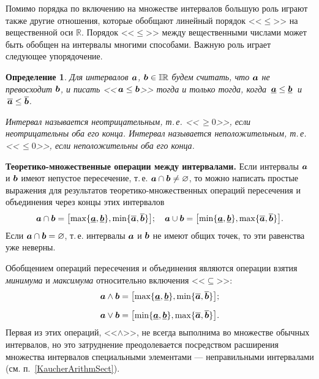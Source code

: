 \documentclass[a5paper,openany]{book}
\newcommand{\mbf}[1]{\protect\text{\boldmath$#1$}}
\newcommand{\mbb}{\mathbb}
\newcommand{\ov}{\overline}
\newcommand{\un}{\underline}
\newtheorem{definition}{Определение}[section]
\begin{document}
{{Помимо порядка по включению на множестве интервалов большую роль играют также другие 
отношения, которые обобщают линейный порядок <<$\leq$>> на вещественной 
оси $\mbb{R}$. 
Порядок <<$\leq$>> между вещественными числами может быть обобщен на интервалы многими способами. Важную роль играет следующее упорядочение.
\begin{definition} 
	Для интервалов $\mbf{a}$, $\mbf{b}\in\mbb{IR}$ будем считать, что
	\textsl{$\mbf{a}$ не превосходит $\mbf{b}$}, и писать <<$\,\mbf{a}\leq 
	\mbf{b}$>> тогда и только тогда, когда $\,\un{\mbf{a}}\leq\un{\mbf{b}}\,$
	и $\,\ov{\mbf{a}}\leq\ov{\mbf{b}}$.  %
	
	Интервал называется \textsl{неотрицательным}, т.\,е. <<$\,\geq 0$>>, если 
	неотрицательны оба его конца. Интервал называется \textsl{неположительным}, 
	т.\,е. <<$\,\leq 0$>>, если неположительны оба его конца. 
\end{definition}

{\bf Теоретико-множественные операции между интервалами.}    
Если интервалы $\mbf{a}$ и $\mbf{b}$ имеют непустое пересечение, т.\,е. $\mbf{a}
\cap \mbf{b} \neq\varnothing$, то можно написать простые выражения для результатов 
теоретико-множественных операций пересечения и объединения через концы этих интервалов 
\begin{align*} 
	\mbf{a}\cap\mbf{b} = 
	\bigl[\max\{\un{\mbf{a}}, \un{\mbf{b}}\}, \min\{\ov{\mbf{a}}, \ov{\mbf{b}}\}\bigr];
\quad
	\mbf{a}\cup\mbf{b} = 
	\bigl[\min\{\un{\mbf{a}}, \un{\mbf{b}}\}, \max\{\ov{\mbf{a}}, \ov{\mbf{b}}\}\bigr].  
\end{align*} 
Если $\mbf{a}\cap\mbf{b} = \varnothing$, т.\,е. интервалы $\mbf{a}$ и $\mbf{b}$ 
не имеют общих точек, то эти равенства уже неверны. 

Обобщением операций пересечения и объединения являются операции взятия \emph{минимума} 
и \emph{максимума} относительно включения <<$\subseteq$>>:  
\begin{align} 
	\mbf{a}\wedge\mbf{b} &= \label{InteMinExpr}
	\bigl[\max\{\un{\mbf{a}}, \un{\mbf{b}}\}, \min\{\ov{\mbf{a}}, \ov{\mbf{b}}\}\bigr];
	\\[2mm]
	\mbf{a}\vee\mbf{b} &= \label{InteMaxExpr}
	\bigl[\min\{\un{\mbf{a}}, \un{\mbf{b}}\}, \max\{\ov{\mbf{a}}, \ov{\mbf{b}}\}\bigr].  
\end{align} 
Первая из этих операций, 
<<$\wedge$>>, не всегда выполнима во множестве обычных интервалов, но это затруднение 
преодолевается посредством расширения множества интервалов специальными элементами 
--- неправильными интервалами (см.  п.~\ref{KaucherArithmSect}). 


}}
\end{document}
